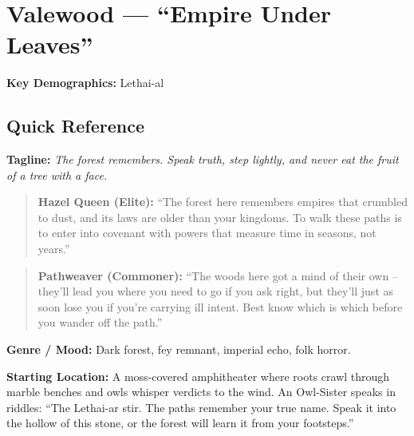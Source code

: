 \section{Valewood --- ``Empire Under Leaves''}
\label{chap:valewood}

\textbf{Key Demographics: } Lethai-al

\subsection*{Quick Reference}
\textbf{Tagline:} \textit{The forest remembers. Speak truth, step lightly, and never eat the fruit of a tree with a face.}

\begin{quote}
  \textbf{Hazel Queen (Elite):}  
  ``The forest here remembers empires that crumbled to dust, and its laws are older than your kingdoms. To walk these paths is to enter into covenant with powers that measure time in seasons, not years.''
\end{quote}

\begin{quote}
  \textbf{Pathweaver (Commoner):}  
  ``The woods here got a mind of their own -- they'll lead you where you need to go if you ask right, but they'll just as soon lose you if you're carrying ill intent. Best know which is which before you wander off the path.''
\end{quote}

\textbf{Genre / Mood:} Dark forest, fey remnant, imperial echo, folk horror.

\textbf{Starting Location:} A moss-covered amphitheater where roots crawl through marble benches and owls whisper verdicts to the wind. An Owl-Sister speaks in riddles: ``The Lethai-ar stir. The paths remember your true name. Speak it into the hollow of this stone, or the forest will learn it from your footsteps.''

